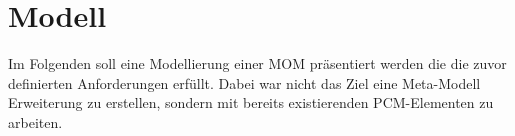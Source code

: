 


\section{Modell}
Im Folgenden soll eine Modellierung einer MOM präsentiert werden die die zuvor definierten Anforderungen erfüllt. Dabei war nicht das Ziel eine Meta-Modell Erweiterung zu erstellen, sondern mit bereits existierenden PCM-Elementen zu arbeiten. 


